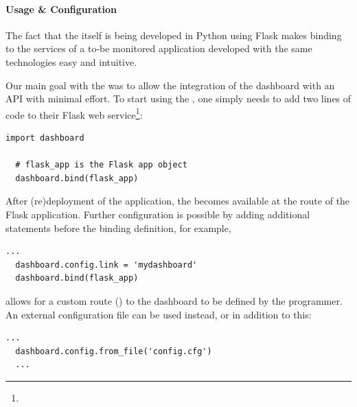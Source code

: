 \documentclass{sig-alternate-05-2015}
\begin{document}
  \paragraph{Usage \& Configuration}
  
  The fact that the \tool itself is being developed in Python using Flask makes binding to the services of a to-be monitored application developed with the same technologies easy and intuitive. 

  Our main goal with the \tool was to allow the integration of the dashboard with an API with minimal effort.
  To start using the \tool, one simply needs to add two lines of code to their Flask web service\footnote{}:

  \begin{lstlisting}[style=custompython]
  import dashboard

  # flask_app is the Flask app object
  dashboard.bind(flask_app)
  \end{lstlisting}

  After (re)deployment of the application, the \tool becomes available at the  route of the Flask application. Further configuration is possible by adding additional statements before the binding definition, for example,

  \begin{lstlisting}[style=custompython]
  ...
  dashboard.config.link = 'mydashboard'
  dashboard.bind(flask_app)
  \end{lstlisting}
  
  allows for a custom route () to the dashboard to be defined by the programmer. An external configuration file can be used instead, or in addition to this:
  
  \begin{lstlisting}[style=custompython]
  ...
  dashboard.config.from_file('config.cfg')
  ...
  \end{lstlisting}
\end{document}
